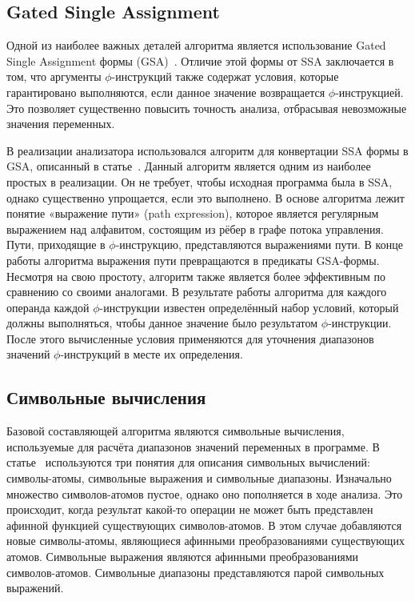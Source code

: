 \subsection{Gated Single Assignment}

Одной из наиболее важных деталей алгоритма является использование
Gated Single Assignment формы
(GSA)~\cite{ottenstein1990program}. Отличие этой формы от SSA
заключается в том, что аргументы $\phi$-инструкций также содержат
условия, которые гарантировано выполняются, если данное значение
возвращается $\phi$-инструкцией. Это позволяет существенно повысить
точность анализа, отбрасывая невозможные значения переменных.

В реализации анализатора использовался алгоритм для конвертации SSA
формы в GSA, описанный в статье~\cite{tu1995efficient}. Данный
алгоритм является одним из наиболее простых в реализации. Он не
требует, чтобы исходная программа была в SSA, однако существенно
упрощается, если это выполнено. В основе алгоритма лежит понятие
«выражение пути» (path expression), которое является регулярным
выражением над алфавитом, состоящим из рёбер в графе потока
управления. Пути, приходящие в $\phi$-инструкцию, представляются
выражениями пути. В конце работы алгоритма выражения пути превращаются
в предикаты GSA-формы. Несмотря на свою простоту, алгоритм также
является более эффективным по сравнению со своими аналогами. В
результате работы алгоритма для каждого операнда каждой
$\phi$-инструкции известен определённый набор условий, который должны
выполняться, чтобы данное значение было результатом
$\phi$-инструкции. После этого вычисленные условия применяются для
уточнения диапазонов значений $\phi$-инструкций в месте их определения.

\subsection{Символьные вычисления}

Базовой составляющей алгоритма являются символьные вычисления,
используемые для расчёта диапазонов значений переменных в программе. В
статье~\cite{li2010practical} используются три понятия для описания
символьных вычислений: символы-атомы, символьные выражения и
символьные диапазоны. Изначально множество символов-атомов пустое,
однако оно пополняется в ходе анализа. Это происходит, когда результат
какой-то операции не может быть представлен афинной функцией
существующих символов-атомов. В этом случае добавляются новые
символы-атомы, являющиеся афинными преобразованиями существующих
атомов. Символьные выражения являются афинными преобразованиями
символов-атомов. Символьные диапазоны представляются парой символьных
выражений.

